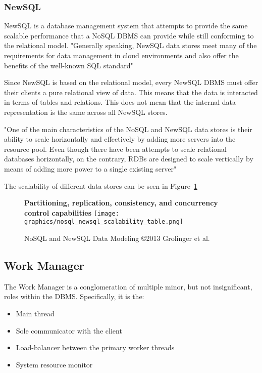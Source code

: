 \documentclass[letterpaper, 12pt]{article}
\begin{document}
\subsubsection{NewSQL}
NewSQL is a database management system that attempts to provide
the same scalable performance that a NoSQL DBMS can provide while still conforming to
the relational model. "Generally speaking, NewSQL data stores meet many of the
requirements for data management in cloud environments and also offer the benefits of
the well-known SQL standard"\cite{grolinger2013data}
\par\vspace{\baselineskip}
Since NewSQL is based on the relational model, every NewSQL DBMS must offer their clients
a pure relational view of data. This means that the data is interacted in terms of tables
and relations. This does not mean that the internal data representation is the same across
all NewSQL stores.
\par\vspace{\baselineskip}
"One of the main characteristics of the NoSQL and NewSQL data stores is their ability to
scale horizontally and effectively by adding more servers into the resource pool. Even
though there have been attempts to scale relational databases horizontally, on the contrary,
RDBs are designed to scale vertically by means of adding more power to a single existing
server"\cite{grolinger2013data}
\par\vspace{\baselineskip}
The scalability of different data stores can be seen in Figure~\ref{fig:nosql_scalability}
\begin{figure}
  \centering
  \label{fig:nosql_scalability}
  \textbf{Partitioning, replication, consistency, and concurrency control capabilities}
  \texttt{[image: graphics/nosql\_newsql\_scalability\_table.png]}
  \caption{NoSQL and NewSQL Data Modeling \copyright 2013 Grolinger et al. \cite{grolinger2013data}}
\end{figure}

\newpage

\subsection{Work Manager}
The Work Manager is a conglomeration of multiple minor, but not insignificant, roles
within the DBMS. Specifically, it is the:
\begin{itemize}
  \item Main thread
  \item Sole communicator with the client
  \item Load-balancer between the primary worker threads
  \item System resource monitor
\end{itemize}
\end{document}
